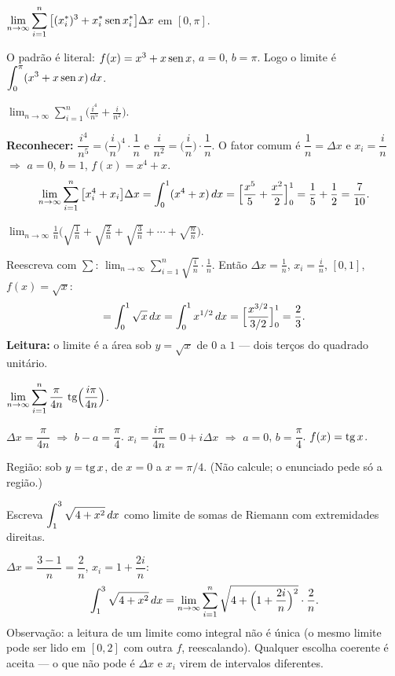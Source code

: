 \begin{exemplo}
$\displaystyle\lim_{n\to\infty}\sum_{i=1}^n\big[(x_i^*)^3+x_i^*\operatorname{sen} x_i^*\big]\Delta x$ em $[0,\pi]$.

O padrão é literal: $f(x)=x^3+x\operatorname{sen} x$, $a=0$, $b=\pi$. Logo o limite é $\displaystyle\int_0^{\pi}(x^3+x\operatorname{sen} x)\,dx$.
\end{exemplo}

\begin{exemplo}
$\displaystyle\lim_{n\to\infty}\sum_{i=1}^n\Big(\frac{i^4}{n^5}+\frac{i}{n^2}\Big)$.

\textbf{Reconhecer:} $\dfrac{i^4}{n^5}=\Big(\dfrac in\Big)^4\cdot\dfrac1n$ e $\dfrac{i}{n^2}=\Big(\dfrac in\Big)\cdot\dfrac1n$. O fator comum é $\dfrac1n=\Delta x$ e $x_i=\dfrac in$ $\Rightarrow$ $a=0$, $b=1$, $f(x)=x^4+x$.
\[
\lim_{n\to\infty}\sum_{i=1}^n\big[x_i^4+x_i\big]\Delta x=\int_0^1(x^4+x)\,dx=\Big[\frac{x^5}{5}+\frac{x^2}{2}\Big]_0^1=\frac15+\frac12=\frac{7}{10}.
\]
\end{exemplo}

\begin{exemplo}
$\displaystyle\lim_{n\to\infty}\frac1n\Big(\sqrt{\tfrac1n}+\sqrt{\tfrac2n}+\sqrt{\tfrac3n}+\cdots+\sqrt{\tfrac nn}\Big)$.

Reescreva com $\sum$: $\displaystyle\lim_{n\to\infty}\sum_{i=1}^n\sqrt{\frac in}\cdot\frac1n$. Então $\Delta x=\frac1n$, $x_i=\frac in$, $[0,1]$, $f(x)=\sqrt x$:
\[
=\int_0^1\sqrt x\,dx=\int_0^1 x^{1/2}\,dx=\Big[\frac{x^{3/2}}{3/2}\Big]_0^1=\frac23 .
\]
\textbf{Leitura:} o limite é a área sob $y=\sqrt x$ de $0$ a $1$ --- dois terços do quadrado unitário.
\end{exemplo}

\begin{exemplo}
$\displaystyle\lim_{n\to\infty}\sum_{i=1}^n\frac{\pi}{4n}\,\operatorname{tg}\!\Big(\frac{i\pi}{4n}\Big)$.

$\Delta x=\dfrac{\pi}{4n}$ $\Rightarrow$ $b-a=\dfrac\pi4$. \; $x_i=\dfrac{i\pi}{4n}=0+i\Delta x$ $\Rightarrow$ $a=0$, $b=\dfrac\pi4$. \; $f(x)=\operatorname{tg} x$.

Região: sob $y=\operatorname{tg} x$, de $x=0$ a $x=\pi/4$. (Não calcule; o enunciado pede só a região.)
\end{exemplo}

\begin{exemplo}
Escreva $\displaystyle\int_1^3\sqrt{4+x^2}\,dx$ como limite de somas de Riemann com extremidades direitas.

$\Delta x=\dfrac{3-1}{n}=\dfrac2n$, \; $x_i=1+\dfrac{2i}{n}$:
\[
\int_1^3\sqrt{4+x^2}\,dx=\lim_{n\to\infty}\sum_{i=1}^n\sqrt{4+\Big(1+\frac{2i}{n}\Big)^2}\cdot\frac2n .
\]
Observação: a leitura de um limite como integral não é única (o mesmo limite pode ser lido em $[0,2]$ com outra $f$, reescalando). Qualquer escolha coerente é aceita --- o que não pode é $\Delta x$ e $x_i$ virem de intervalos diferentes.
\end{exemplo}


